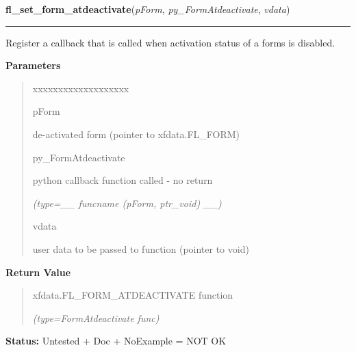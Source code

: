     \label{xformslib:library:fl_set_form_atdeactivate}

    \vspace{0.5ex}

\hspace{.8\funcindent}\begin{boxedminipage}{\funcwidth}

    \raggedright \textbf{fl\_set\_form\_atdeactivate}(\textit{pForm}, \textit{py\_FormAtdeactivate}, \textit{vdata})

    \vspace{-1.5ex}

    \rule{\textwidth}{0.5\fboxrule}
\setlength{\parskip}{2ex}
    Register a callback that is called when activation status of a forms is
    disabled.

\setlength{\parskip}{1ex}
      \textbf{Parameters}
      \vspace{-1ex}

      \begin{quote}
        \begin{Ventry}{xxxxxxxxxxxxxxxxxxx}

          \item[pForm]

          de-activated form (pointer to xfdata.FL\_FORM)

          \item[py\_FormAtdeactivate]

          python callback function called - no return

            {\it (type=\_\_ funcname (pForm, ptr\_void) \_\_)}

          \item[vdata]

          user data to be passed to function (pointer to void)

        \end{Ventry}

      \end{quote}

      \textbf{Return Value}
    \vspace{-1ex}

      \begin{quote}
      xfdata.FL\_FORM\_ATDEACTIVATE function

      {\it (type=FormAtdeactivate func)}

      \end{quote}

\textbf{Status:} Untested + Doc + NoExample = NOT OK



    \end{boxedminipage}

